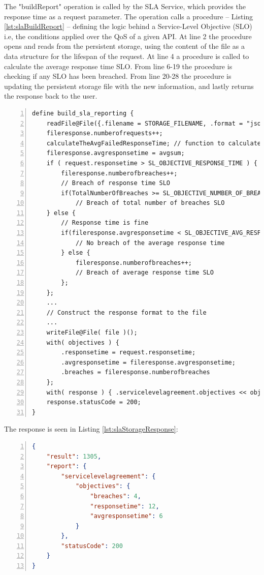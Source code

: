 \documentclass[12pt]{article}
\begin{document}
The "buildReport" operation is called by the SLA Service, which provides the response time as a request parameter. The operation calls a procedure -- Listing \ref{lst:slaBuildReport} -- defining the logic behind a Service-Level Objective (SLO) i.e, the conditions applied over the QoS of a given API. At line 2 the procedure opens and reads from the persistent storage, using the content of the file as a data structure for the lifespan of the request. At line 4 a procedure is called to calculate the average response time SLO. From line 6-19 the procedure is checking if any SLO has been breached. From line 20-28 the procedure is updating the persistent storage file with the new information, and lastly returns the response back to the user. 

\begin{lstlisting}[caption=Updates persistent storage file and checks for contractual breaches, captionpos=b, label={lst:slaBuildReport}, frame=single, breaklines=true, numbers=left, basicstyle=\scriptsize]
define build_sla_reporting {
    readFile@File({.filename = STORAGE_FILENAME, .format = "json" })(fileresponse);
    fileresponse.numberofrequests++;
    calculateTheAvgFailedResponseTime; // function to calculate the total average response time 
    fileresponse.avgresponsetime = avgsum;
    if ( request.responsetime > SL_OBJECTIVE_RESPONSE_TIME ) {
        fileresponse.numberofbreaches++;
        // Breach of response time SLO
        if(TotalNumberOfBreaches >= SL_OBJECTIVE_NUMBER_OF_BREACH_RESPONSE_TIMES) 
            // Breach of total number of breaches SLO
    } else {
        // Response time is fine
        if(fileresponse.avgresponsetime < SL_OBJECTIVE_AVG_RESPONSE_TIME) {
            // No breach of the average response time
        } else {
            fileresponse.numberofbreaches++;
            // Breach of average response time SLO
        };
    };
    ...
    // Construct the response format to the file
    ...
    writeFile@File( file )();
    with( objectives ) {
        .responsetime = request.responsetime;
        .avgresponsetime = fileresponse.avgresponsetime;
        .breaches = fileresponse.numberofbreaches
    };
    with( response ) { .servicelevelagreement.objectives << objectives };
    response.statusCode = 200;
}
\end{lstlisting}
\newpage
The response is seen in Listing \ref{lst:slaStorageResponse}:

\begin{lstlisting}[caption=The response to the client when a calculation is requested, 
captionpos=b, language=json, label={lst:slaStorageResponse}, numbers=left]
{
    "result": 1305,
    "report": {
        "servicelevelagreement": {
            "objectives": {
                "breaches": 4,
                "responsetime": 12,
                "avgresponsetime": 6
            }
        },
        "statusCode": 200
    }
}
\end{lstlisting}
\end{document}
